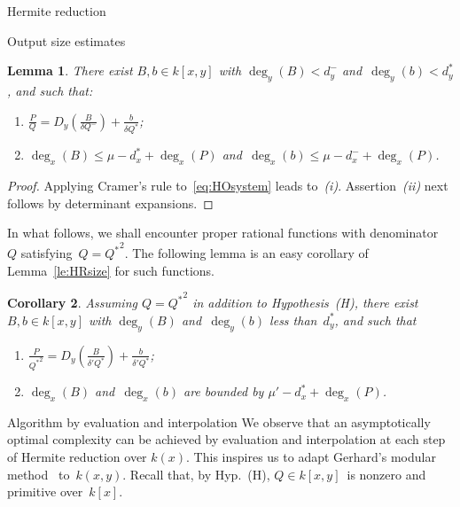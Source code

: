 \documentclass{sig-alt-full}
\newtheorem{lemma}{Lemma}
\newtheorem{cor}[lemma]{Corollary}
\begin{document}
\begin{section}{Hermite reduction}
\begin{subsection}{Output size estimates}
\begin{lemma}
There exist $B, b\in k[x, y]$ with
$\deg_y(B) < d_y^-$ and~$\deg_y(b) < d_y^*$, and such that:
\vspace{-0.15cm}
\begin{enumerate}
\item[(i)] $\frac{P}{Q} = D_y \left(\frac{B}{\delta Q^-}\right) + \frac{b}{\delta Q^*}$;
\vspace{-0.2cm}
\item[(ii)] $\deg_x(B) \le \mu - d_x^* + \deg_x(P)$
and~$\deg_x(b)\le \mu - d_x^- + \deg_x(P)$.
\end{enumerate}
\end{lemma}
\begin{proof}
Applying Cramer's rule to~\eqref{eq:HOsystem}
leads to~\emph{(i)}.
Assertion~\emph{(ii)\/} next follows by determinant expansions.
\end{proof}

In what follows, we shall encounter proper rational functions
with denominator~$Q$ satisfying~$Q={Q^*}^2$.
The following lemma is an easy corollary of Lemma~\ref{le:HRsize} for
such functions.
\begin{cor} \label{cor:specialQ}
Assuming $Q={Q^*}^2$ in addition to Hypothesis~(H), there exist $B,
b\in k[x, y]$ with $\deg_y(B)$ and~$\deg_y(b)$ less than~$d_y^*$, and
such that
\begin{enumerate}
\item[(i)] $\frac{P}{{Q^*}^2} = D_y\left(\frac{B}{\delta'Q^*}\right) + \frac{b}{\delta'Q^*}$;
\item[(ii)] $\deg_x(B)$ and~$\deg_x(b)$ are bounded
by $\mu'-d_x^*+\deg_x(P)$.
\end{enumerate}
\end{cor}
\end{subsection}
\begin{subsection}{Algorithm by evaluation and interpolation}
We observe that an asymptotically optimal complexity can be achieved
by evaluation and interpolation at each step of Hermite reduction
over $k(x)$. This inspires us to adapt Gerhard's modular
method~\cite{Gerhard2001, Gerhard2004} to~$k(x, y)$.
Recall that, by Hyp.~(H), $Q\in k[x, y]$~is nonzero and primitive over~$k[x]$.



\end{subsection}
\end{section}
\end{document}
